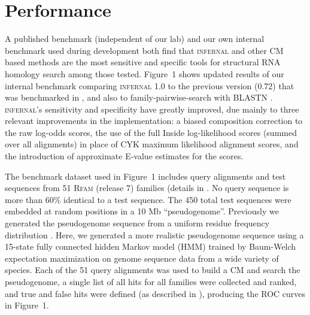 
\section{Performance}


A published benchmark (independent of our lab) \citep{Freyhult07} and
our own internal benchmark used during development
\citep{NawrockiEddy07} both find that \textsc{infernal} and other CM
based methods are the most sensitive and specific tools for structural
RNA homology search among those tested. Figure~1 shows
updated results of our internal benchmark comparing \textsc{infernal}
1.0 to the previous version (0.72) that was benchmarked in
\citet{Freyhult07}, and also to family-pairwise-search with BLASTN
\citep{Altschul97,Grundy98b}.  \textsc{infernal}'s sensitivity and
specificity have greatly improved, due mainly to 
three relevant improvements in the implementation: a biased
composition correction to the raw log-odds scores, the use of the full
Inside log-likelihood scores (summed over all alignments) in place of
CYK maximum likelihood alignment scores, and the introduction of
approximate E-value estimates for the scores.



The benchmark dataset used in Figure~1 includes query alignments and
test sequences from 51 \textsc{Rfam} (release 7) families (details in
\citep{NawrockiEddy07}. 
No query sequence is more than 60\% identical to a test sequence.
The 450 total test sequences were embedded at random positions in a 10
Mb ``pseudogenome''.  Previously we generated the pseudogenome
sequence from a uniform residue frequency distribution
\citep{NawrockiEddy07}.  Here, we generated a more realistic
pseudogenome sequence using a 15-state fully connected hidden Markov
model (HMM) trained by Baum-Welch expectation maximization
\citep{Durbin98} on genome sequence data from a wide variety of
species.  Each of the 51 query alignments was used to build a CM and
search the pseudogenome, a single list of all hits for all families
were collected and ranked, and true and false hits were defined (as
described in \citet{NawrockiEddy07}), producing the ROC curves in
Figure~1.



